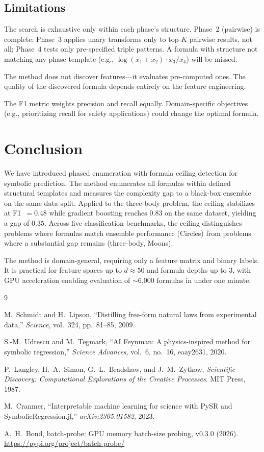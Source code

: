 \documentclass[journal]{IEEEtran}
\begin{document}
\subsection{Limitations}

The search is exhaustive only within each phase's structure.
Phase~2 (pairwise) is complete; Phase~3 applies unary transforms
only to top-$K$ pairwise results, not all; Phase~4 tests only
pre-specified triple patterns. A formula with structure not matching
any phase template (e.g., $\log(x_1 + x_2) \cdot x_3 / x_4$) will
be missed.

The method does not discover features---it evaluates pre-computed
ones. The quality of the discovered formula depends entirely on the
feature engineering.

The F1 metric weights precision and recall equally. Domain-specific
objectives (e.g., prioritizing recall for safety applications) could
change the optimal formula.

\section{Conclusion}

We have introduced phased enumeration with formula ceiling detection
for symbolic prediction. The method enumerates all formulas within
defined structural templates and measures the complexity gap to a
black-box ensemble on the same data split. Applied to the three-body
problem, the ceiling stabilizes at F1~$= 0.48$ while gradient
boosting reaches $0.83$ on the same dataset, yielding a gap of $0.35$.
Across five classification benchmarks, the ceiling distinguishes
problems where formulas match ensemble performance (Circles) from
problems where a substantial gap remains (three-body, Moons).

The method is domain-general, requiring only a feature matrix and
binary labels. It is practical for feature spaces up to $d \approx 50$
and formula depths up to 3, with GPU acceleration enabling evaluation
of $\sim$6{,}000 formulas in under one minute.

\begin{thebibliography}{9}

M.~Schmidt and H.~Lipson, ``Distilling free-form natural laws from
experimental data,'' \emph{Science}, vol.~324, pp.~81--85, 2009.

S.-M.~Udrescu and M.~Tegmark, ``AI Feynman: A physics-inspired
method for symbolic regression,'' \emph{Science Advances}, vol.~6,
no.~16, eaay2631, 2020.

P.~Langley, H.~A.~Simon, G.~L.~Bradshaw, and J.~M.~Zytkow,
\emph{Scientific Discovery: Computational Explorations of the
Creative Processes}. MIT Press, 1987.

M.~Cranmer, ``Interpretable machine learning for science with PySR
and SymbolicRegression.jl,'' \emph{arXiv:2305.01582}, 2023.

A.~H.~Bond, batch-probe: GPU memory batch-size probing, v0.3.0
(2026). \url{https://pypi.org/project/batch-probe/}

\end{thebibliography}
\end{document}
